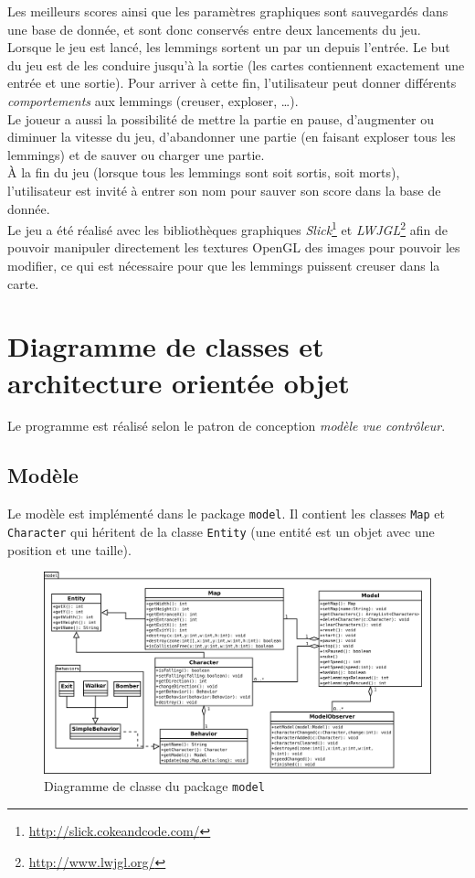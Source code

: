 \documentclass[a4paper,12pt]{article}
\begin{document}
Les meilleurs scores ainsi que les paramètres graphiques sont sauvegardés
dans une base de donnée, et sont donc conservés entre deux lancements du
jeu.\\

Lorsque le jeu est lancé, les lemmings sortent un par un depuis
l'entrée. Le but du jeu est de les conduire jusqu'à la sortie (les
cartes contiennent exactement une entrée et une sortie). Pour arriver
à cette fin, l'utilisateur peut donner différents \emph{comportements}
aux lemmings (creuser, exploser, \dots).\\

Le joueur a aussi la possibilité de mettre la partie en pause,
d'augmenter ou diminuer la vitesse du jeu, d'abandonner une partie (en
faisant exploser tous les lemmings) et de sauver ou charger une
partie.\\

À la fin du jeu (lorsque tous les lemmings sont soit sortis, soit
morts), l'utilisateur est invité à entrer son nom pour sauver son
score dans la base de donnée.\\

Le jeu a été réalisé avec les bibliothèques graphiques
\emph{Slick}\footnote{\url{http://slick.cokeandcode.com/}} et
\emph{LWJGL}\footnote{\url{http://www.lwjgl.org/}} afin de pouvoir
manipuler directement les textures OpenGL des images pour pouvoir les
modifier, ce qui est nécessaire pour que les lemmings puissent creuser
dans la carte.

\section{Diagramme de classes et architecture orientée objet}
Le programme est réalisé selon le patron de conception \emph{modèle
  vue contrôleur}.

\subsection{Modèle}
Le modèle est implémenté dans le package \texttt{model}. Il contient
les classes \texttt{Map} et \texttt{Character} qui héritent de la
classe \texttt{Entity} (une entité est un objet avec une position et
une taille).

\begin{figure}[ht!]
  \centerline{
  \includegraphics[width=\textwidth]{model.png}}
  \caption{Diagramme de classe du package \texttt{model}}
\end{figure}
\end{document}
